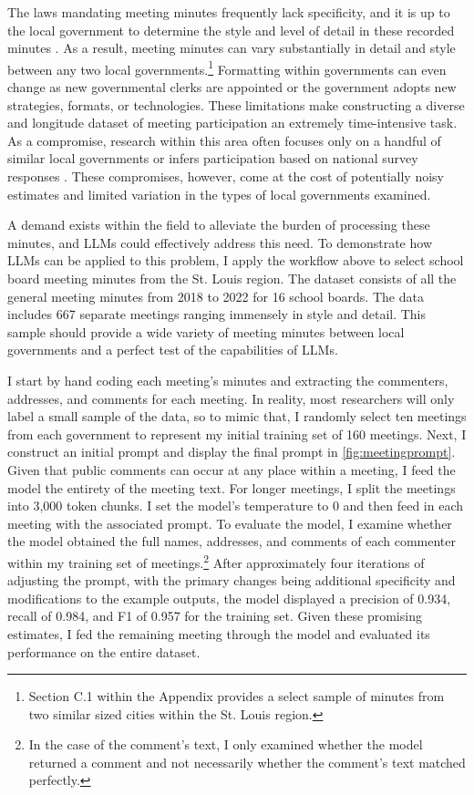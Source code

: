     The laws mandating meeting minutes frequently lack specificity, and it is up to the local government to determine the style and level of detail in these recorded minutes \citep{oconnorAssemblyRequiredApplication2004}. As a result, meeting minutes can vary substantially in detail and style between any two local governments.\footnote{Section C.1 within the Appendix provides a select sample of minutes from two similar sized cities within the St. Louis region.} Formatting within governments can even change as new governmental clerks are appointed or the government adopts new strategies, formats, or technologies. These limitations make constructing a diverse and longitude dataset of meeting participation an extremely time-intensive task. As a compromise, research within this area often focuses only on a handful of similar local governments \citep[e.g.,][]{yoderDoesPropertyOwnership2020,einsteinWhoParticipatesLocal2019} or infers participation based on national survey responses \citep{nuamahCloseHomePlaceBased2021}. These compromises, however, come at the cost of potentially noisy estimates and limited variation in the types of local governments examined.

    A demand exists within the field to alleviate the burden of processing these minutes, and LLMs could effectively address this need. To demonstrate how LLMs can be applied to this problem, I apply the workflow above to select school board meeting minutes from the St. Louis region. The dataset consists of all the general meeting minutes from 2018 to 2022 for 16 school boards. The data includes 667 separate meetings ranging immensely in style and detail. This sample should provide a wide variety of meeting minutes between local governments and a perfect test of the capabilities of LLMs.

    I start by hand coding each meeting's minutes and extracting the commenters, addresses, and comments for each meeting. In reality, most researchers will only label a small sample of the data, so to mimic that, I randomly select ten meetings from each government to represent my initial training set of 160 meetings. Next, I construct an initial prompt and display the final prompt in  \autoref{fig:meetingprompt}. Given that public comments can occur at any place within a meeting, I feed the model the entirety of the meeting text. For longer meetings, I split the meetings into 3,000 token chunks. I set the model's temperature to 0 and then feed in each meeting with the associated prompt. To evaluate the model, I examine whether the model obtained the full names, addresses, and comments of each commenter within my training set of meetings.\footnote{In the case of the comment's text, I only examined whether the model returned a comment and not necessarily whether the comment's text matched perfectly.} After approximately four iterations of adjusting the prompt, with the primary changes being additional specificity and modifications to the example outputs, the model displayed a precision of 0.934, recall of 0.984, and F1 of 0.957 for the training set. Given these promising estimates, I fed the remaining meeting through the model and evaluated its performance on the entire dataset.

